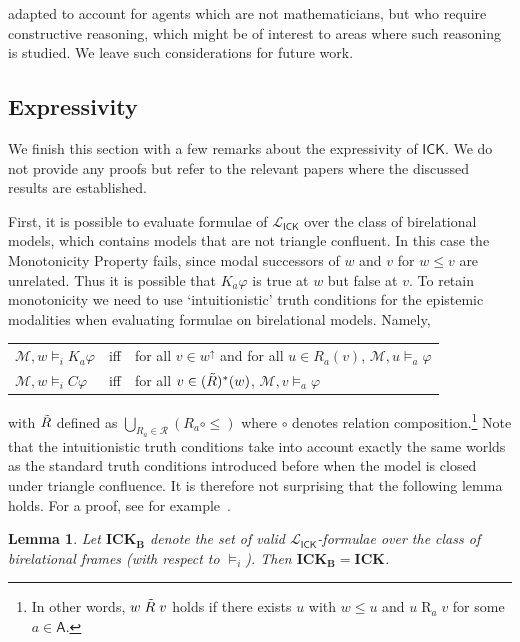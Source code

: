 \documentclass{myifcolog}
\newcommand\C {C}
\newcommand{\K}{K}
\newcommand\A{\mathsf{A}}
\newcommand{\agi}{a}
\newcommand{\ICK}{\mathsf{ICK}}
\newcommand{\LICK}{\mathcal{L}_{\ICK}}
\newcommand{\fw}{\mathcal{M}}
\newcommand{\Rel}{\mathrel{R}}
\newcommand{\rel}{\mathcal{R}}
\newtheorem{lemma}[theorem]{Lemma}
\numberwithin{theorem}{section}
\begin{document}
adapted to account for agents which are not mathematicians, but who require constructive reasoning, which might be of interest to areas where such reasoning is studied. We leave such considerations for future work.

\subsection{Expressivity}\label{ss: expressivity}

We finish this section with a few remarks about the expressivity of $\ICK$. We do not provide any proofs but refer to the relevant papers where the discussed results are established.

First, it is possible to evaluate formulae of $\LICK$ over the class of birelational models, which contains models that are not triangle confluent. In this case the Monotonicity Property fails, since modal successors of $w$ and $v$ for $w \leq v$ are unrelated. Thus it is possible that $K_\agi \varphi$ is true at $w$ but false at $v$. To retain monotonicity we need to use `intuitionistic' truth conditions for the epistemic modalities when evaluating formulae on birelational models. Namely,
\begin{center}
    \begin{tabular}{l l l}
$\fw, w \models_i \K_\agi \varphi$ & iff & for all $v \in w^\uparrow$ and for all $u \in R_\agi(v)$, $\fw, u \models_\agi \varphi$\\
$\fw, w \models_i\C \varphi$ & iff & for all $v \in (\Tilde{R})^*(w)$, $\fw, v \models_\agi \varphi$\\
    \end{tabular}
\end{center}
with $\Tilde{R}$ defined as $\bigcup_{R_\agi \in \rel}(R_\agi \circ \leq)$ where $\circ$ denotes relation composition.\footnote{In other words, $w \mathrel{\Tilde{R}} v$ holds if there exists $u$ with $w \leq u$ and $u \Rel_\agi v$ for some $\agi \in \A$.} Note that the intuitionistic truth conditions take into account exactly the same worlds as the standard truth conditions introduced before when the model is closed under triangle confluence. It is therefore not surprising that the following lemma holds. For a proof, see for example~\cite{litak_2018, Zenger_2025}.

\begin{lemma}
    Let $\mathbf{ICK_B}$ denote the set of valid $\LICK$-formulae over the class of birelational frames (with respect to $\models_i$). Then $\mathbf{ICK_B} = \mathbf{ICK}$.
\end{lemma}
\end{document}
